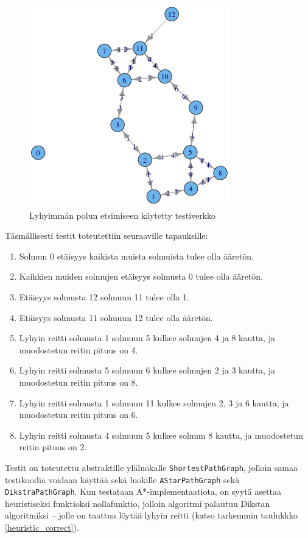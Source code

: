 \documentclass[10pt,a4paper]{article}
\begin{document}
\begin{figure}
\includegraphics[scale=.5]{test_network.png} 
\caption{Lyhyimmän polun etsimiseen käytetty testiverkko}
\label{testiverkko}
\end{figure}

Täsmällisesti testit toteutettiin seuraaville tapauksille:

\begin{enumerate}
\item Solmun 0 etäisyys kaikista muista solmuista tulee olla ääretön.
\item Kaikkien muiden solmujen etäisyys solmusta 0 tulee olla ääretön.
\item Etäisyys solmusta 12 solmuun 11 tulee olla 1.
\item Etäisyys solmusta 11 solmuun 12 tulee olla ääretön.
\item Lyhyin reitti solmusta 1 solmuun 5 kulkee solmujen 4 ja 8 kautta, ja muodostetun reitin pituus on 4.
\item Lyhyin reitti solmusta 5 solmuun 6 kulkee solmujen 2 ja 3 kautta, ja muodostetun reitin pituus on 8.
\item Lyhyin reitti solmusta 1 solmuun 11 kulkee solmujen 2, 3 ja 6 kautta, ja muodostetun reitin pituus on 6.
\item Lyhyin reitti solmusta 4 solmuun 5 kulkee solmun 8 kautta, ja muodostetun reitin pituus on 2.
\label{network_test}
\end{enumerate}

Testit on toteutettu abstraktille yläluokalle \texttt{ShortestPathGraph}, jolloin samaa testikoodia voidaan käyttää sekä luokille \texttt{AStarPathGraph} sekä \texttt{DikstraPathGraph}. Kun testataan A*-implementaatiota, on syytä asettaa heuristiseksi funktioksi nollafunktio, jolloin algoritmi palautuu Dikstan algoritmiksi -- jolle on taattua löytää lyhyin reitti (katso tarkemmin taulukkko \ref{heuristic_correct}).
\end{document}

